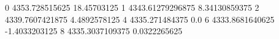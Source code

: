0 4353.728515625 18.45703125
1 4343.61279296875 8.34130859375
2 4339.7607421875 4.4892578125
4 4335.271484375 0.0
6 4333.8681640625 -1.4033203125
8 4335.3037109375 0.0322265625
